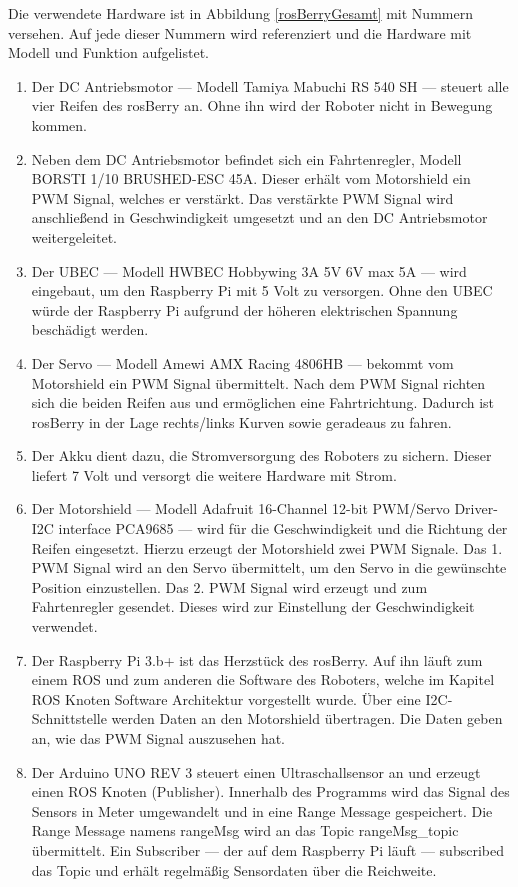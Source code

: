 \documentclass[conference]{IEEEtran}
\begin{document}
Die verwendete Hardware ist in Abbildung \ref{rosBerryGesamt} mit Nummern versehen.
Auf jede dieser Nummern wird referenziert und die Hardware mit Modell und Funktion aufgelistet.

\begin{enumerate}
	\item Der DC Antriebsmotor — Modell Tamiya Mabuchi RS 540 SH — steuert alle vier Reifen des rosBerry an.
	Ohne ihn wird der Roboter nicht in Bewegung kommen.
	\item Neben dem DC Antriebsmotor befindet sich ein Fahrtenregler, Modell BORSTI 1/10 BRUSHED-ESC 45A.
	Dieser erhält vom Motorshield ein PWM Signal, welches er verstärkt.
	Das verstärkte PWM Signal wird anschließend in Geschwindigkeit umgesetzt und an den DC Antriebsmotor weitergeleitet.
	\item Der UBEC — Modell HWBEC Hobbywing 3A 5V 6V max 5A — wird eingebaut, um den Raspberry Pi mit 5 Volt zu versorgen.
	Ohne den UBEC würde der Raspberry Pi aufgrund der höheren elektrischen Spannung beschädigt werden.
	\item Der Servo — Modell Amewi AMX Racing 4806HB — bekommt vom Motorshield ein PWM Signal übermittelt.
	Nach dem PWM Signal richten sich die beiden Reifen aus und ermöglichen eine Fahrtrichtung.
	Dadurch ist rosBerry in der Lage rechts/links Kurven sowie geradeaus zu fahren.
	\item Der Akku dient dazu, die Stromversorgung des Roboters zu sichern.
	Dieser liefert 7 Volt und versorgt die weitere Hardware mit Strom.
	\item Der Motorshield — Modell Adafruit 16-Channel 12-bit PWM/Servo Driver-I2C interface PCA9685 — wird für die Geschwindigkeit und die Richtung der Reifen eingesetzt.
	Hierzu erzeugt der Motorshield zwei PWM Signale.
	Das 1. PWM Signal wird an den Servo übermittelt, um den Servo in die gewünschte Position einzustellen.
	Das 2. PWM Signal wird erzeugt und zum Fahrtenregler gesendet.
	Dieses wird zur Einstellung der Geschwindigkeit verwendet.
	\item Der Raspberry Pi 3.b+ ist das Herzstück des rosBerry.
	Auf ihn läuft zum einem ROS und zum anderen die Software des Roboters, welche im Kapitel ROS Knoten Software Architektur vorgestellt wurde.
	Über eine I2C-Schnittstelle werden Daten an den Motorshield übertragen.
	Die Daten geben an, wie das PWM Signal auszusehen hat.
	\item Der Arduino UNO REV 3 steuert einen Ultraschallsensor an und erzeugt einen ROS Knoten (Publisher).
	Innerhalb des Programms wird das Signal des Sensors in Meter umgewandelt und in eine Range Message gespeichert.
	Die Range Message namens rangeMsg wird an das Topic rangeMsg\_topic übermittelt.
	Ein Subscriber — der auf dem Raspberry Pi läuft — subscribed das Topic und erhält regelmäßig Sensordaten über die Reichweite.
	

\end{enumerate}
\end{document}
